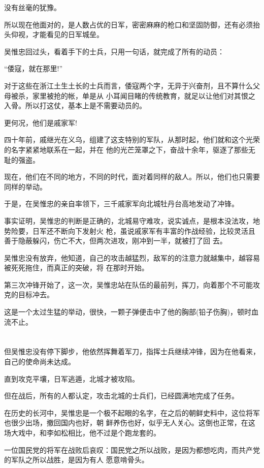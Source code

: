 \documentclass[11pt,a4paper,onecolumn]{article}
\begin{document}
没有丝毫的犹豫。

所以现在他面对的，是人数占优的日军，密密麻麻的枪口和坚固防御，还有必须抬头仰视，才能看见的日军城垒。

吴惟忠回过头，看着手下的士兵，只用一句话，就完成了所有的动员：

``倭寇，就在那里!''

对于这些在浙江土生土长的士兵而言，倭寇两个字，无异于兴奋剂，且不算什么父母被杀，家里被抢的帐，单是从
小耳闻目睹的传统教育，就足以让他们对其恨之入骨。所以打这仗，基本上是不需要动员的。

更何况，他们是戚家军!

四十年前，戚继光在义乌，组建了这支特别的军队，从那时起，他们就和这个光荣的名字紧紧地联系在一起，并在
他的光芒笼罩之下，奋战十余年，驱逐了那些无耻的强盗。

现在，他们在不同的地方，不同的时代，面对着同样的敌人。所以，他们也只需要同样的举动。

于是，在吴惟忠的亲自率领下，三千戚家军向北城牡丹台高地发动了冲锋。

事实证明，吴惟忠的判断是正确的，北城易守难攻，说实诚点，是根本没法攻，地势险要，日军还不断向下发射火
枪，虽说戚家军有丰富的作战经验，比较灵活且善于隐蔽躲闪，伤亡不大，但两次进攻，刚冲到一半，就被打了回
去。

吴惟忠没有放弃，他知道，自己的攻击越猛烈，敌军的的注意力就越集中，越容易被死死拖住，而真正的突破，将
在那时开始。

第三次冲锋开始了，这一次，吴惟忠站在队伍的最前列，挥刀，向着那个不可能攻克的目标冲去。

这是一个太过生猛的举动，很快，一颗子弹便击中了他的胸部(铅子伤胸)，顿时血流不止。

\section[\thesection]{}

但吴惟忠没有停下脚步，他依然挥舞着军刀，指挥士兵继续冲锋，因为在他看来，自己的使命尚未达成。

直到攻克平壤，日军逃遁，北城才被攻陷。

但在战后，所有的人都认定，攻击北城的士兵们，已经圆满地完成了任务。

在历史的长河中，吴惟忠是一个极不起眼的名字，在之后的朝鲜史料中，这位将军也很少出场，撤回国内也好，朝
鲜养伤也好，似乎无人关心。这倒也正常，在这场大戏中，和李如松相比，他不过是个跑龙套的。

一位国民党的将军在战败后哀叹：国民党之所以战败，是因为都想吃肉，而共产党的军队之所以战胜，是因为有人
愿意啃骨头。
\end{document}
